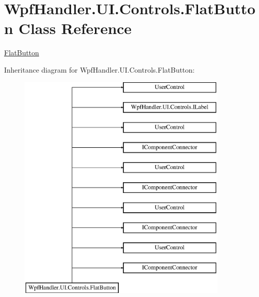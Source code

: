 \hypertarget{class_wpf_handler_1_1_u_i_1_1_controls_1_1_flat_button}{}\section{Wpf\+Handler.\+U\+I.\+Controls.\+Flat\+Button Class Reference}
\label{class_wpf_handler_1_1_u_i_1_1_controls_1_1_flat_button}


\mbox{\hyperlink{class_wpf_handler_1_1_u_i_1_1_controls_1_1_flat_button}{Flat\+Button}}  


Inheritance diagram for Wpf\+Handler.\+U\+I.\+Controls.\+Flat\+Button\+:\begin{figure}[H]
\begin{center}
\leavevmode
\includegraphics[height=11.000000cm]{d0/d83/class_wpf_handler_1_1_u_i_1_1_controls_1_1_flat_button}
\end{center}
\end{figure}
